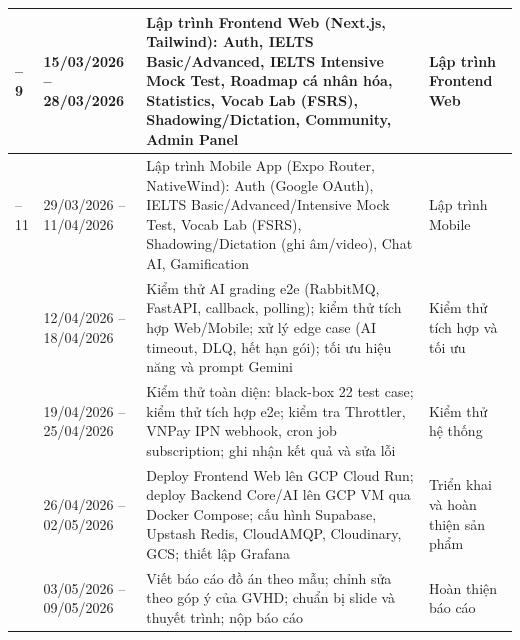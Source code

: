 {\begin{longtable}{|>{\centering\arraybackslash}p{15\tbu}|p{28\tbu}|p{62\tbu}|p{40\tbu}|}
    8--9 & 15/03/2026 -- 28/03/2026 & Lập trình Frontend Web (Next.js, Tailwind): Auth, IELTS Basic/Advanced, IELTS Intensive Mock Test, Roadmap cá nhân hóa, Statistics, Vocab Lab (FSRS), Shadowing/Dictation, Community, Admin Panel & Lập trình Frontend Web \\ \hline
    10--11 & 29/03/2026 -- 11/04/2026 & Lập trình Mobile App (Expo Router, NativeWind): Auth (Google OAuth), IELTS Basic/Advanced/Intensive Mock Test, Vocab Lab (FSRS), Shadowing/Dictation (ghi âm/video), Chat AI, Gamification & Lập trình Mobile \\ \hline
    12 & 12/04/2026 -- 18/04/2026 & Kiểm thử AI grading e2e (RabbitMQ, FastAPI, callback, polling); kiểm thử tích hợp Web/Mobile; xử lý edge case (AI timeout, DLQ, hết hạn gói); tối ưu hiệu năng và prompt Gemini & Kiểm thử tích hợp và tối ưu \\ \hline
    13 & 19/04/2026 -- 25/04/2026 & Kiểm thử toàn diện: black-box 22 test case; kiểm thử tích hợp e2e; kiểm tra Throttler, VNPay IPN webhook, cron job subscription; ghi nhận kết quả và sửa lỗi & Kiểm thử hệ thống \\ \hline
    14 & 26/04/2026 -- 02/05/2026 & Deploy Frontend Web lên GCP Cloud Run; deploy Backend Core/AI lên GCP VM qua Docker Compose; cấu hình Supabase, Upstash Redis, CloudAMQP, Cloudinary, GCS; thiết lập Grafana & Triển khai và hoàn thiện sản phẩm \\ \hline
    15 & 03/05/2026 -- 09/05/2026 & Viết báo cáo đồ án theo mẫu; chỉnh sửa theo góp ý của GVHD; chuẩn bị slide và thuyết trình; nộp báo cáo & Hoàn thiện báo cáo \\ \hline
\end{longtable}
}
